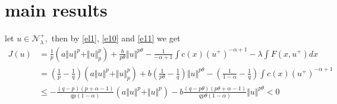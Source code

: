 \documentclass[10pt,twoside,reqno,centertags,draft]{amsart}
\begin{document}
\section{main results}
\begin{corollary}\label{c1}
let $ u \in \mathcal{N}_{\lambda}^{+},$ then by \ref{el1}, \ref{e10} and \ref{e11} we get
\footnotesize
\begin{equation}
\begin{aligned}
J(u) &=  \frac{1}{p} \left(a \Vert u \Vert^p + \Vert u \Vert^{p}_p\right) + \frac{b}{p \theta}\Vert u \Vert^{p \theta}  -\frac{1}{-\alpha+1} \int c(x)( u^+)^{-\alpha+1} - \lambda \int F(x,u^+)dx\\
     &= \left( \frac{1}{p} -\frac{1}{q}\right)\left( a \Vert u \Vert^p + \Vert u \Vert_{p}^{p}\right) +b\left( \frac{1}{p\theta} -\frac{1}{q}\right)\Vert u \Vert^{p \theta} -\left(\frac{1}{1-\alpha} -\frac{1}{q}\right)\int c(x)(u^+)^{-\alpha+1}\\
     &\leq  -\frac{(q-p)(p +\alpha -1)}{q p (1 -\alpha)}\left( a \Vert u \Vert^p + \Vert u \Vert^{p}\right) -b\frac{(q -p\theta)(p\theta +\alpha -1)}{q p\theta (1 -\alpha)}\Vert u \Vert^{p \theta} < 0
\end{aligned}
\end{equation}
\end{corollary}
\end{document}
